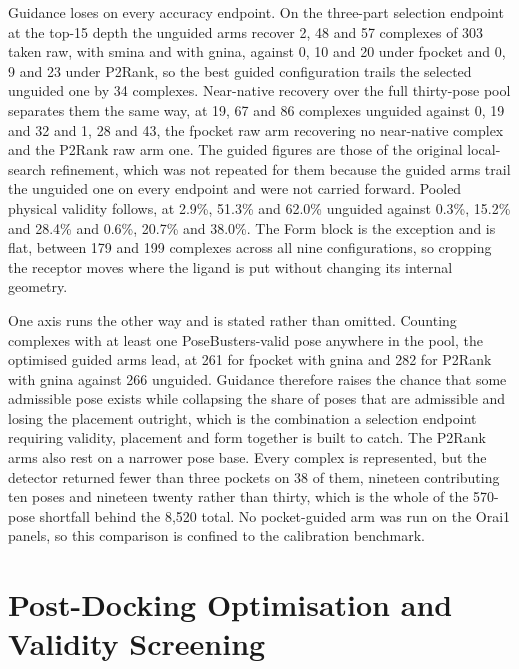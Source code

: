Guidance loses on every accuracy endpoint. On the three-part selection endpoint at the top-15 depth the unguided arms recover 2, 48 and 57 complexes of 303 taken raw, with smina and with gnina, against 0, 10 and 20 under fpocket and 0, 9 and 23 under P2Rank, so the best guided configuration trails the selected unguided one by 34 complexes. Near-native recovery over the full thirty-pose pool separates them the same way, at 19, 67 and 86 complexes unguided against 0, 19 and 32 and 1, 28 and 43, the fpocket raw arm recovering no near-native complex and the P2Rank raw arm one. The guided figures are those of the original local-search refinement, which was not repeated for them because the guided arms trail the unguided one on every endpoint and were not carried forward. Pooled physical validity follows, at 2.9\%, 51.3\% and 62.0\% unguided against 0.3\%, 15.2\% and 28.4\% and 0.6\%, 20.7\% and 38.0\%. The Form block is the exception and is flat, between 179 and 199 complexes across all nine configurations, so cropping the receptor moves where the ligand is put without changing its internal geometry.

One axis runs the other way and is stated rather than omitted. Counting complexes with at least one PoseBusters-valid pose anywhere in the pool, the optimised guided arms lead, at 261 for fpocket with gnina and 282 for P2Rank with gnina against 266 unguided. Guidance therefore raises the chance that some admissible pose exists while collapsing the share of poses that are admissible and losing the placement outright, which is the combination a selection endpoint requiring validity, placement and form together is built to catch. The P2Rank arms also rest on a narrower pose base. Every complex is represented, but the detector returned fewer than three pockets on 38 of them, nineteen contributing ten poses and nineteen twenty rather than thirty, which is the whole of the 570-pose shortfall behind the 8,520 total. No pocket-guided arm was run on the Orai1 panels, so this comparison is confined to the calibration benchmark.

\hypertarget{post-docking-optimisation-and-validity-screening}{%
\section{Post-Docking Optimisation and Validity Screening}\label{post-docking-optimisation-and-validity-screening}}

